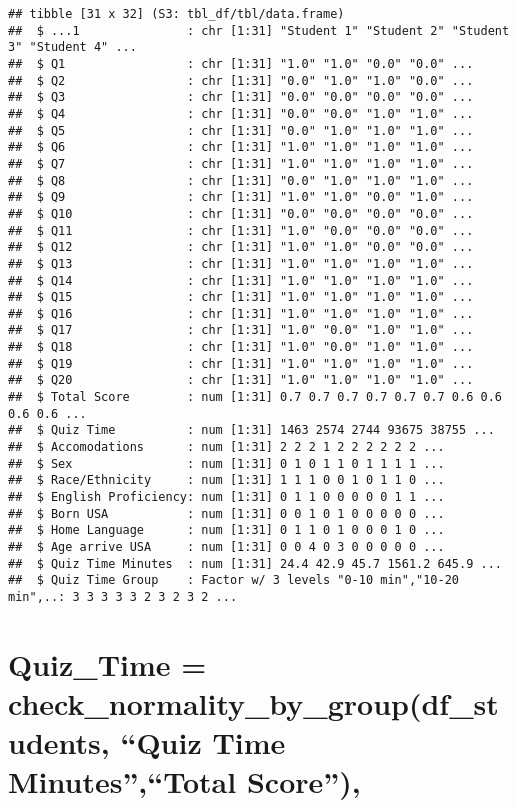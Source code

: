 \documentclass[
]{article}
\begin{document}
\begin{verbatim}
## tibble [31 x 32] (S3: tbl_df/tbl/data.frame)
##  $ ...1               : chr [1:31] "Student 1" "Student 2" "Student 3" "Student 4" ...
##  $ Q1                 : chr [1:31] "1.0" "1.0" "0.0" "0.0" ...
##  $ Q2                 : chr [1:31] "0.0" "1.0" "1.0" "0.0" ...
##  $ Q3                 : chr [1:31] "0.0" "0.0" "0.0" "0.0" ...
##  $ Q4                 : chr [1:31] "0.0" "0.0" "1.0" "1.0" ...
##  $ Q5                 : chr [1:31] "0.0" "1.0" "1.0" "1.0" ...
##  $ Q6                 : chr [1:31] "1.0" "1.0" "1.0" "1.0" ...
##  $ Q7                 : chr [1:31] "1.0" "1.0" "1.0" "1.0" ...
##  $ Q8                 : chr [1:31] "0.0" "1.0" "1.0" "1.0" ...
##  $ Q9                 : chr [1:31] "1.0" "1.0" "0.0" "1.0" ...
##  $ Q10                : chr [1:31] "0.0" "0.0" "0.0" "0.0" ...
##  $ Q11                : chr [1:31] "1.0" "0.0" "0.0" "0.0" ...
##  $ Q12                : chr [1:31] "1.0" "1.0" "0.0" "0.0" ...
##  $ Q13                : chr [1:31] "1.0" "1.0" "1.0" "1.0" ...
##  $ Q14                : chr [1:31] "1.0" "1.0" "1.0" "1.0" ...
##  $ Q15                : chr [1:31] "1.0" "1.0" "1.0" "1.0" ...
##  $ Q16                : chr [1:31] "1.0" "1.0" "1.0" "1.0" ...
##  $ Q17                : chr [1:31] "1.0" "0.0" "1.0" "1.0" ...
##  $ Q18                : chr [1:31] "1.0" "0.0" "1.0" "1.0" ...
##  $ Q19                : chr [1:31] "1.0" "1.0" "1.0" "1.0" ...
##  $ Q20                : chr [1:31] "1.0" "1.0" "1.0" "1.0" ...
##  $ Total Score        : num [1:31] 0.7 0.7 0.7 0.7 0.7 0.7 0.6 0.6 0.6 0.6 ...
##  $ Quiz Time          : num [1:31] 1463 2574 2744 93675 38755 ...
##  $ Accomodations      : num [1:31] 2 2 2 1 2 2 2 2 2 2 ...
##  $ Sex                : num [1:31] 0 1 0 1 1 0 1 1 1 1 ...
##  $ Race/Ethnicity     : num [1:31] 1 1 1 0 0 1 0 1 1 0 ...
##  $ English Proficiency: num [1:31] 0 1 1 0 0 0 0 0 1 1 ...
##  $ Born USA           : num [1:31] 0 0 1 0 1 0 0 0 0 0 ...
##  $ Home Language      : num [1:31] 0 1 1 0 1 0 0 0 1 0 ...
##  $ Age arrive USA     : num [1:31] 0 0 4 0 3 0 0 0 0 0 ...
##  $ Quiz Time Minutes  : num [1:31] 24.4 42.9 45.7 1561.2 645.9 ...
##  $ Quiz Time Group    : Factor w/ 3 levels "0-10 min","10-20 min",..: 3 3 3 3 3 2 3 2 3 2 ...
\end{verbatim}

\section{Quiz\_Time = check\_normality\_by\_group(df\_students, ``Quiz
Time Minutes'',``Total
Score''),}\label{quiz_time-check_normality_by_groupdf_students-quiz-time-minutestotal-score}
\end{document}
